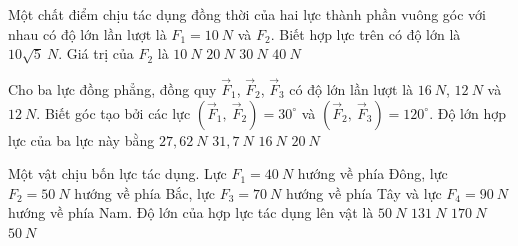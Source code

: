\begin{ex}%
Một chất điểm chịu tác dụng đồng thời của hai lực thành phần vuông góc với nhau có độ lớn lần lượt là $F_{1}=10\ N$ và $F_{2}$. Biết hợp lực trên có độ lớn là $10 \sqrt{5}\ N$. Giá trị của $F_{2}$ là
\choice
{$10\ N$}
{\True $20\ N$}
{$30\ N$}
{$40\ N$}

\end{ex}
\begin{ex}%
Cho ba lực đồng phẳng, đồng quy $\vec{F}_{1}$, $\vec{F}_{2}$, $\vec{F}_{3}$ có độ lớn lần lượt là $16\ N$, $12\ N$ và $12\ N$. Biết góc tạo bởi các lực $\left(\vec{F}_{1},\ \vec{F}_{2}\right)=30^{\circ}$ và $\left(\vec{F}_{2},\ \vec{F}_{3}\right)=120^{\circ}$. Độ lớn hợp lực của ba lực này bằng
\choice
{$27,62\ N$}
{$31,7\ N$}
{$16\ N$}
{\True $20\ N$}

 \end{ex}
\begin{ex}%
Một vật chịu bốn lực tác dụng. Lực $F_1 = 40\ N$ hướng về phía Đông, lực $F_2 = 50\ N$ hướng về phía Bắc, lực $F_3 = 70\ N$ hướng về phía Tây và lực $F_4 = 90\ N$ hướng về phía Nam. Độ lớn của hợp lực tác dụng lên vật là
\choice
{\True $50\ N$}
{$131\ N$}
{$170\ N$}
{$50\ N$}
 \end{ex}



